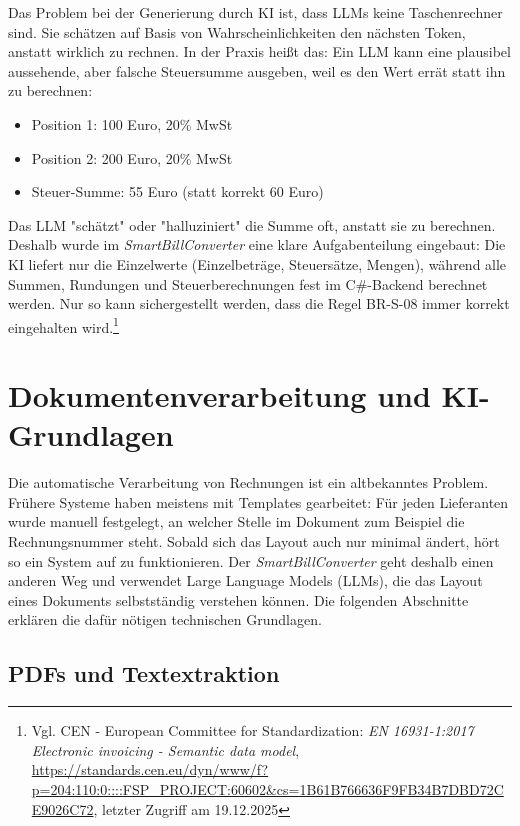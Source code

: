 Das Problem bei der Generierung durch KI ist, dass LLMs keine Taschenrechner sind. Sie schätzen auf Basis von Wahrscheinlichkeiten den nächsten Token, anstatt wirklich zu rechnen. In der Praxis heißt das: Ein LLM kann eine plausibel aussehende, aber falsche Steuersumme ausgeben, weil es den Wert errät statt ihn zu berechnen:
\begin{itemize}
    \item Position 1: 100 Euro, 20\% MwSt
    \item Position 2: 200 Euro, 20\% MwSt
    \item Steuer-Summe: 55 Euro (statt korrekt 60 Euro)
\end{itemize}
Das LLM "schätzt" oder "halluziniert" die Summe oft, anstatt sie zu berechnen.
Deshalb wurde im \textit{SmartBillConverter} eine klare Aufgabenteilung eingebaut: Die KI liefert nur die Einzelwerte (Einzelbeträge, Steuersätze, Mengen), während alle Summen, Rundungen und Steuerberechnungen fest im C\#-Backend berechnet werden. Nur so kann sichergestellt werden, dass die Regel BR-S-08 immer korrekt eingehalten wird.\footnote{Vgl. CEN - European Committee for Standardization: \textit{EN 16931-1:2017 Electronic invoicing - Semantic data model}, \url{https://standards.cen.eu/dyn/www/f?p=204:110:0::::FSP_PROJECT:60602&cs=1B61B766636F9FB34B7DBD72CE9026C72}, letzter Zugriff am 19.12.2025}

\chapter{Dokumentenverarbeitung und KI-Grundlagen}
\label{chap:doc_processing_ai}

Die automatische Verarbeitung von Rechnungen ist ein altbekanntes Problem. Frühere Systeme haben meistens mit Templates gearbeitet: Für jeden Lieferanten wurde manuell festgelegt, an welcher Stelle im Dokument zum Beispiel die Rechnungsnummer steht. Sobald sich das Layout auch nur minimal ändert, hört so ein System auf zu funktionieren. Der \textit{SmartBillConverter} geht deshalb einen anderen Weg und verwendet Large Language Models (LLMs), die das Layout eines Dokuments selbstständig verstehen können. Die folgenden Abschnitte erklären die dafür nötigen technischen Grundlagen.

\section{PDFs und Textextraktion}
\label{sec:pdf_extraction}


